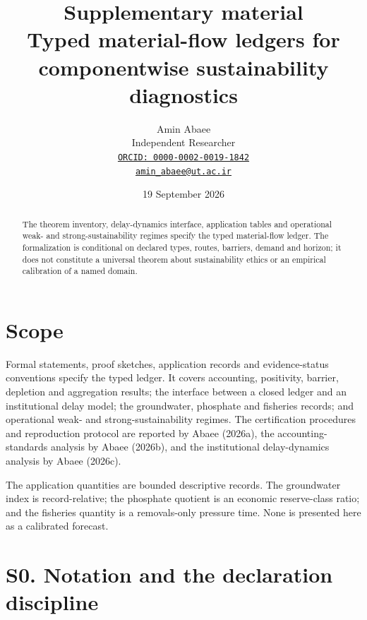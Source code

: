 \documentclass[11pt]{article}
\begin{document}
\title{Supplementary material\\
\large Typed material-flow ledgers for componentwise sustainability diagnostics}
\author{Amin Abaee\\[0.25em]
{\small Independent Researcher}\\[0.25em]
{\small\href{https://orcid.org/0000-0002-0019-1842}{\nolinkurl{ORCID: 0000-0002-0019-1842}}}\\[0.25em]
{\small\href{mailto:amin_abaee@ut.ac.ir}{\nolinkurl{amin_abaee@ut.ac.ir}}}}
\date{19 September 2026}
\maketitle

\begin{abstract}
The theorem inventory, delay-dynamics interface, application tables and operational weak- and strong-sustainability regimes specify the typed material-flow ledger. The formalization is conditional on declared types, routes, barriers, demand and horizon; it does not constitute a universal theorem about sustainability ethics or an empirical calibration of a named domain.
\end{abstract}

\section*{Scope}

Formal statements, proof sketches, application records and evidence-status conventions specify the typed ledger. It covers accounting, positivity, barrier, depletion and aggregation results; the interface between a closed ledger and an institutional delay model; the groundwater, phosphate and fisheries records; and operational weak- and strong-sustainability regimes. The certification procedures and reproduction protocol are reported by Abaee (2026a), the accounting-standards analysis by Abaee (2026b), and the institutional delay-dynamics analysis by Abaee (2026c).

The application quantities are bounded descriptive records. The groundwater index is record-relative; the phosphate quotient is an economic reserve-class ratio; and the fisheries quantity is a removals-only pressure time. None is presented here as a calibrated forecast.

\section*{S0. Notation and the declaration discipline}
\end{document}

